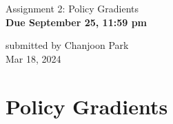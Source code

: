 \documentclass{article}
\begin{document}

\begin{centering}
    {\Large Assignment 2: Policy Gradients} \\
    \vspace{.25cm}
    \textbf{Due September 25, 11:59 pm} \\
\end{centering}

\begin{flushright}
    submitted by Chanjoon Park \\
    Mar 18, 2024
\end{flushright}

\setcounter{section}{3}
\section{Policy Gradients}
\end{document}
